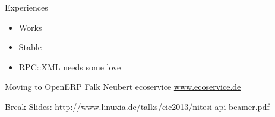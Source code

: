 \begin{frame}{Experiences}
\begin{itemize}
\item Works
\item Stable
\item RPC::XML needs some love
\end{itemize}
\end{frame}

\begin{frame}{Moving to OpenERP}
Falk Neubert
ecoservice
\url{www.ecoservice.de}
\end{frame}

\begin{frame}{Break}
Slides:
\url{http://www.linuxia.de/talks/eic2013/nitesi-api-beamer.pdf}
\end{frame}



